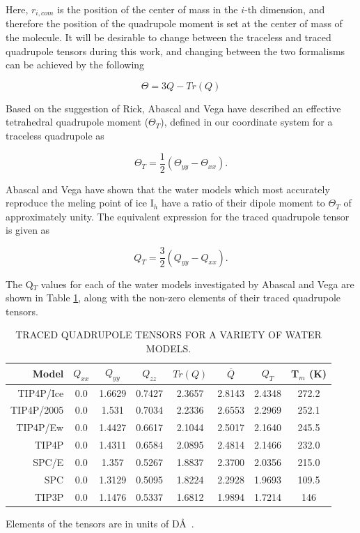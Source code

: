 Here, $r_{i,com}$ is the position of the center of mass in the $i$-th 
dimension, and therefore the position of the quadrupole moment is set at the 
center of mass of the molecule. It will be desirable to change between the
traceless and traced quadrupole tensors during this work, and changing 
between the two formalisms can be achieved by the following

\begin{equation}
\Theta = 3Q - Tr(Q)
\end{equation}    

Based on the suggestion of Rick\cite{Rick2004}, Abascal and Vega have
described an effective tetrahedral quadrupole moment ($\Theta_T$),
defined in our coordinate system for a traceless quadrupole as

\begin{equation}
\Theta_{T} = \frac{1}{2}(\Theta_{yy} - \Theta_{xx}).
\end{equation} 

Abascal and Vega have shown that the water models which most accurately
reproduce the meling point of ice I$_h$ have a ratio of their dipole moment
to $\Theta_T$ of approximately unity. The equivalent expression for the 
traced quadrupole tensor is given as

\begin{equation}
Q_{T} = \frac{3}{2}(Q_{yy} - Q_{xx}).
\end{equation}
 
The Q$_T$ values for each of the water models
investigated by Abascal and Vega are shown in Table \ref{Models_quad}, along 
with the non-zero elements of their traced quadrupole tensors.

\begin{table}[h!]
\caption{TRACED QUADRUPOLE TENSORS FOR A VARIETY OF WATER MODELS.}
\label{Models_quad}
\begin{tabular}{rccccccc}
\hline
Model & $Q_{xx}$ & $Q_{yy}$ & $Q_{zz}$ & $Tr(Q)$ & $\overline{Q}$ & $Q_{T}$ &
                                                                    T$_{m}$ (K) \\
\hline \hline
TIP4P/Ice & 0.0 & 1.6629 & 0.7427 & 2.3657 & 2.8143 & 2.4348  & 272.2 \\
TIP4P/2005 & 0.0 & 1.531 & 0.7034 & 2.2336 & 2.6553 & 2.2969  & 252.1 \\
TIP4P/Ew & 0.0 & 1.4427 & 0.6617 & 2.1044  & 2.5017 & 2.1640  & 245.5   \\
TIP4P & 0.0 & 1.4311 & 0.6584 & 2.0895 & 2.4814 & 2.1466 & 232.0 \\
SPC/E & 0.0 & 1.357 & 0.5267 & 1.8837 & 2.3700 & 2.0356 & 215.0 \\
SPC & 0.0 & 1.3129 & 0.5095 & 1.8224 & 2.2928 & 1.9693 & 109.5 \\
TIP3P & 0.0 & 1.1476 & 0.5337 & 1.6812 & 1.9894 & 1.7214 & 146 \\
\hline \hline
\end{tabular}
\begin{flushleft}
Elements of the tensors are in units of D\AA~. \\
\end{flushleft}
\end{table} 

